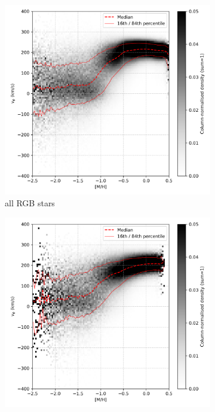 \documentclass[a4paper,12pt]{article}
\begin{document}
\begin{figure}
  \centering
  \begin{subfigure}[b]{0.32\textwidth}
    \includegraphics[width=\textwidth]{../figures/vis_mh_vphi_all.png}
    \caption{all RGB stars}
  \end{subfigure}\hfill
  \begin{subfigure}[b]{0.32\textwidth}
    \includegraphics[width=\textwidth]{../figures/vis_mh_vphi_high_alpha.png}

\end{subfigure}
\end{figure}
\end{document}
